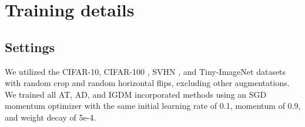 \documentclass{article} %
\begin{document}
 





\section{Training details}
\label{sec:apendix_training_detail}
\subsection{Settings}
We utilized the CIFAR-10, CIFAR-100 \citep{krizhevsky2009learning}, SVHN \cite{svhn}, and Tiny-ImageNet \citep{le2015tiny} datasets with random crop and random horizontal flips, excluding other augmentations.
We trained all AT, AD, and IGDM incorporated methods using an SGD momentum optimizer with the same initial learning rate of 0.1, momentum of 0.9, and weight decay of 5e-4. 
\end{document}
